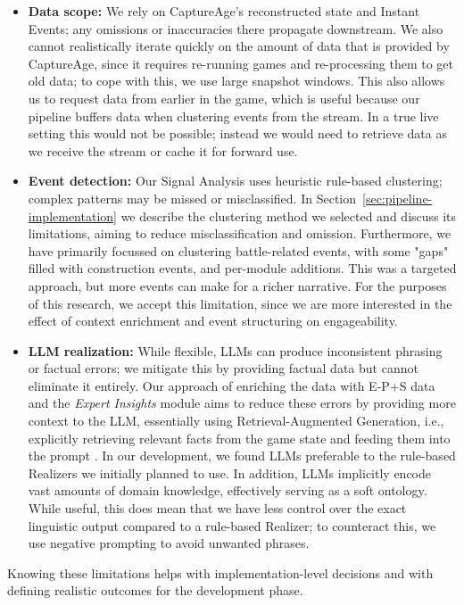 \begin{itemize}
  \item \textbf{Data scope:} We rely on CaptureAge's reconstructed state and Instant Events; any omissions or inaccuracies there propagate downstream. We also cannot realistically iterate quickly on the amount of data that is provided by CaptureAge, since it requires re-running games and re-processing them to get old data; to cope with this, we use large snapshot windows. This also allows us to request data from earlier in the game, which is useful because our pipeline buffers data when clustering events from the stream. In a true live setting this would not be possible; instead we would need to retrieve data as we receive the stream or cache it for forward use.
  \item \textbf{Event detection:} Our Signal Analysis uses heuristic rule-based clustering; complex patterns may be missed or misclassified. In Section~\ref{sec:pipeline-implementation} we describe the clustering method we selected and discuss its limitations, aiming to reduce misclassification and omission. Furthermore, we have primarily focussed on clustering battle-related events, with some "gaps" filled with construction events, and per-module additions. This was a targeted approach, but more events can make for a richer narrative. For the purposes of this research, we accept this limitation, since we are more interested in the effect of context enrichment and event structuring on engageability.
  \item \textbf{LLM realization:} While flexible, LLMs can produce inconsistent phrasing or factual errors; we mitigate this by providing factual data but cannot eliminate it entirely. Our approach of enriching the data with E-P+S data and the \textit{Expert Insights} module aims to reduce these errors by providing more context to the LLM, essentially using Retrieval-Augmented Generation, i.e., explicitly retrieving relevant facts from the game state and feeding them into the prompt \cite{lewis2020}. In our development, we found LLMs preferable to the rule-based Realizers we initially planned to use. In addition, LLMs implicitly encode vast amounts of domain knowledge, effectively serving as a soft ontology. While useful, this does mean that we have less control over the exact linguistic output compared to a rule-based Realizer; to counteract this, we use negative prompting to avoid unwanted phrases.
\end{itemize}
Knowing these limitations helps with implementation-level decisions and with defining realistic outcomes for the development phase.


